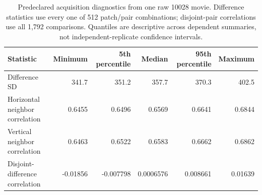 \begin{table}[t]
\centering\small
\caption{Predeclared acquisition diagnostics from one raw 10028 movie. Difference statistics use every one of 512 patch/pair combinations; disjoint-pair correlations use all 1,792 comparisons. Quantiles are descriptive across dependent summaries, not independent-replicate confidence intervals.}
\begin{tabular}{lrrrrr}
\toprule
Statistic & Minimum & 5th percentile & Median & 95th percentile & Maximum \\
\midrule
Difference SD & 341.7 & 351.2 & 357.7 & 370.3 & 402.5 \\
Horizontal neighbor correlation & 0.6455 & 0.6496 & 0.6569 & 0.6641 & 0.6844 \\
Vertical neighbor correlation & 0.6463 & 0.6522 & 0.6583 & 0.6662 & 0.6862 \\
Disjoint-difference correlation & -0.01856 & -0.007798 & 0.0006576 & 0.008661 & 0.01639 \\
\bottomrule
\end{tabular}
\end{table}
